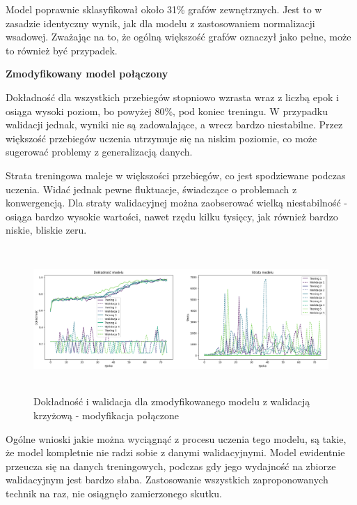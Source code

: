 Model poprawnie sklasyfikował około 31\% grafów zewnętrznych.
Jest to w zasadzie identyczny wynik, jak dla modelu z zastosowaniem normalizacji wsadowej.
Zważając na to, że ogólną większość grafów oznaczył jako pełne, może to również być przypadek.

\textbf{Zmodyfikowany model połączony}

Dokładność dla wszystkich przebiegów stopniowo wzrasta wraz z liczbą epok
i osiąga wysoki poziom, bo powyżej 80\%, pod koniec treningu.
W przypadku walidacji jednak, wyniki nie są zadowalające, a wrecz bardzo niestabilne.
Przez większość przebiegów uczenia utrzymuje się na niskim poziomie,
co może sugerować problemy z generalizacją danych.

Strata treningowa maleje w większości przebiegów, co jest spodziewane podczas uczenia.
Widać jednak pewne fluktuacje, świadczące o problemach z konwergencją.
Dla straty walidacyjnej można zaobserować wielką niestabilność - osiąga bardzo wysokie wartości,
nawet rzędu kilku tysięcy, jak również bardzo niskie, bliskie zeru.

\begin{figure}[ht]
	\centering
	\includegraphics[height=5.5cm]{resources/tests/images/v4/crossvalid_img.png}
	\caption{Dokładność i walidacja dla zmodyfikowanego modelu z walidacją krzyżową - modyfikacja połączone}
	\label{Fig:tests-cv-5a}
\end{figure}
\FloatBarrier

Ogólne wnioski jakie można wyciągnąć z procesu uczenia tego modelu,
są takie, że model kompletnie nie radzi sobie z danymi walidacyjnymi.
Model ewidentnie przeucza się na danych treningowych,
podczas gdy jego wydajność na zbiorze walidacyjnym jest bardzo słaba.
Zastosowanie wszystkich zaproponowanych technik na raz,
nie osiągnęło zamierzonego skutku. 

